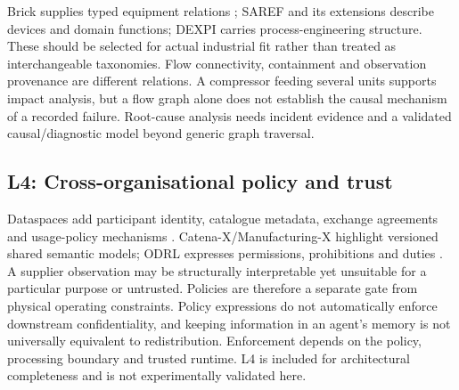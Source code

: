 Brick supplies typed equipment relations \cite{balaji2016brick}; SAREF and its
extensions describe devices and domain functions; DEXPI carries process-engineering
structure. These should be selected for actual industrial fit rather than treated
as interchangeable taxonomies. Flow connectivity, containment and observation
provenance are different relations. A compressor feeding several units supports
impact analysis, but a flow graph alone does not establish the causal mechanism
of a recorded failure. Root-cause analysis needs incident evidence and a validated
causal/diagnostic model beyond generic graph traversal.

\subsection{L4: Cross-organisational policy and trust}
Dataspaces add participant identity, catalogue metadata, exchange agreements and
usage-policy mechanisms \cite{idsa2022ram}. Catena-X/Manufacturing-X highlight
versioned shared semantic models; ODRL expresses permissions, prohibitions and
duties \cite{w3c2018odrl}. A supplier observation may be structurally interpretable
yet unsuitable for a particular purpose or untrusted. Policies are therefore a
separate gate from physical operating constraints. Policy expressions do not
automatically enforce downstream confidentiality, and keeping information in an
agent's memory is not universally equivalent to redistribution. Enforcement
depends on the policy, processing boundary and trusted runtime. L4 is included
for architectural completeness and is not experimentally validated here.